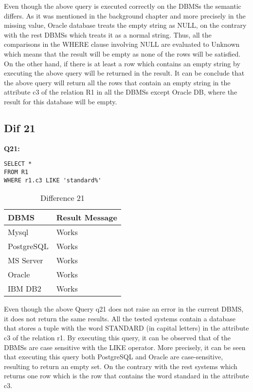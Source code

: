 Even though the above query is executed correctly on the DBMSs the semantic differs. As it was mentioned in the background chapter and more precisely in the missing value, Oracle database treats the empty string as NULL, on the contrary with the rest DBMSs which treats it as a normal string. Thus, all the comparisons in the WHERE clause involving NULL are evaluated to Unknown which means that the result will be empty as none of the rows will be satisfied.  On the other hand, if there is at least a row which contains an empty string by executing the above query will be returned in the result. It can be conclude that the above query will return all the rows that contain an empty string in the attribute c3 of the relation R1 in all the DBMSs except Oracle DB, where the result for this database will be empty.


\subsection{Dif 21}

\textbf{Q21:}
\begin{mdframed}[backgroundcolor=lightgray!20]
\begin{lstlisting}[style=SQL]
SELECT *
FROM R1
WHERE r1.c3 LIKE 'standard%'
\end{lstlisting}
\end{mdframed}


\begin{table}[h]
\centering
\caption{Difference 21}
\label{my-label}
\begin{tabular}{|p{2cm}|p{11.5cm}| }
\hline
\textbf{DBMS} & \textbf{Result Message} \\ \hline
Mysql         & Works                   \\ \hline
PostgreSQL    & Works                   \\ \hline
MS Server     & Works                   \\ \hline
Oracle        & Works                   \\ \hline
IBM DB2       & Works                   \\ \hline
\end{tabular}
\end{table}

Even though the above Query q21 does not raise an error in the current DBMS, it does not return the same results. All the tested systems contain a database that stores a tuple with the word STANDARD (in capital letters) in the attribute c3 of the relation r1. By executing this query, it can be observed that of the DBMSs are case sensitive with the LIKE operator. More precisely, it can be seen that executing this query both PostgreSQL and Oracle are case-sensitive, resulting to return an empty set. On the contrary with the rest systems which returns one row which is the row that contains the word standard in the attribute c3.  



